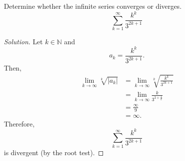 \documentclass[compacto,10pt,comentarios]{aleph-notas}
\begin{document}
\begin{ejer}
    Determine whether the infinite series converges or diverges.
    $$
        \sum_{k=1}^{\infty} \frac{k ^ {k}}{3 ^ {2k + 1}}
    $$
\end{ejer}
\begin{proof}[Solution]
    Let $k \in \mathbb{N}$ and
    $$
        a_k = \frac{k ^ {k}}{3 ^ {2k + 1}}.
    $$
    Then,
    \begin{align*}
        \lim_{k \to \infty} \sqrt[k]{|a_k|}
        & = \lim_{k \to \infty} \sqrt[k]{\frac{k ^ {k}}{3 ^ {2k + 1}}} \\
        & = \lim_{k \to \infty} \frac{k}{3^{2 + \frac{1}{k}}} \\
        & = \frac{\infty}{9} \\
        & = \infty.
    \end{align*}
    Therefore,
    $$
        \sum_{k=1}^{\infty} \frac{k ^ {k}}{3 ^ {2k + 1}}
    $$
    is divergent (by the root test).
\end{proof}
\end{document}
